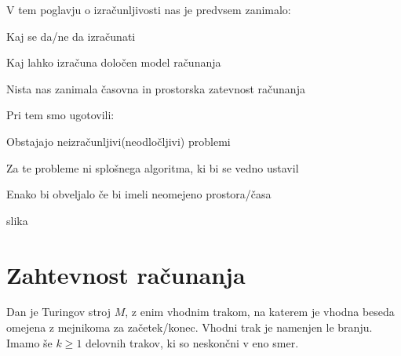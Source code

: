 \documentclass[10pt,a4paper,oneside]{book}
\begin{document}
\begin{neurejeno}
{%
}

V tem poglavju o izračunljivosti nas je predvsem zanimalo:
\begin{items}
\item Kaj se da/ne da izračunati
\item Kaj lahko izračuna določen model računanja
\item Nista nas zanimala časovna in prostorska zatevnost računanja
\end{items}

Pri tem smo ugotovili:
\begin{items}
\item Obstajajo neizračunljivi(neodločljivi) problemi
\item Za te probleme ni splošnega algoritma, ki bi se vedno ustavil
\item Enako bi obveljalo če bi imeli neomejeno prostora/časa 
\end{items}

\fixme slika %

\chapter{Zahtevnost računanja}



Dan je Turingov stroj $M$, z enim vhodnim trakom, na katerem je vhodna beseda omejena z mejnikoma za začetek/konec. Vhodni trak je namenjen le branju. Imamo še $k \geq 1$ delovnih trakov, ki so neskončni v eno smer.


\end{neurejeno}
\end{document}
